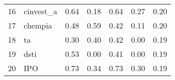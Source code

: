 \documentclass[12pt]{article}
\begin{document}
\begin{footnotesize}
\begin{longtable}{rl|c|c|c|c|c}
				16                   & cinvest\_a                  & 0.64                             & 0.18                                                                                          & 0.64                                                                                          & 0.27                                                                                          & 0.20                                                                                                   \\
				17                   & chempia                     & 0.48                             & 0.59                                                                                          & 0.42                                                                                          & 0.11                                                                                          & 0.20                                                                                                   \\
				18                   & ta                          & 0.30                             & 0.40                                                                                          & 0.42                                                                                          & 0.00                                                                                          & 0.19                                                                                                   \\
				19                   & dsti                        & 0.53                             & 0.00                                                                                          & 0.41                                                                                          & 0.00                                                                                          & 0.19                                                                                                   \\
				20                   & IPO                         & 0.73                             & 0.34                                                                                          & 0.73                                                                                          & 0.30                                                                                          & 0.19                                                                                                   \\

\end{longtable}
\end{footnotesize}
\end{document}

